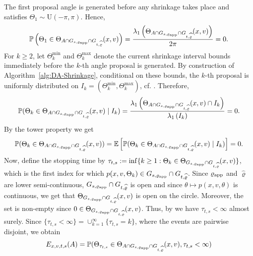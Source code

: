 \documentclass[sn-mathphys-num]{sn-jnl}%
\theoremstyle{thmstyleone}%
\theoremstyle{thmstyletwo}%
\theoremstyle{thmstylethree}%
\newcommand{\rhoapp}{\varrho_{{\rm app}}}
\begin{document}
\begin{appendices}
\begin{enumerate}
{    The first proposal angle is generated before any shrinkage takes place and satisfies $\Theta_1\sim \mathrm{U}(-\pi,\pi)$. Hence,
    \begin{align*}
        \mathbb P\left(\Theta_1\in \Theta_{A\cap G_{s,\varrho_{\textmd{app}}}\cap G_{t,\widehat{\varrho}}}(x,v)\right)= \frac{\lambda_1\left(\Theta_{A\cap G_{s,\varrho_{\textmd{app}}}\cap G_{t,\widehat{\varrho}}}(x,v)\right)}{2\pi}=0.
    \end{align*}
    For $k\geq 2$, let $\Theta^{\min}_k$ and $\Theta^{\max}_k$ denote the current shrinkage interval bounds immediately before the $k$-th angle proposal is generated. By construction of Algorithm~\ref{alg:DA-Shrinkage}, conditional on these bounds, the $k$-th proposal is uniformly distributed on $I_k=(\Theta^{\min}_k, \Theta^{\max}_k)$, cf. \citet[Equation~(4)]{HasenpflugEtAl2023}. Therefore, 
    \begin{align*}
        \mathbb{P}(\Theta_k\in \Theta_{A\cap G_{s,\varrho_{\textmd{app}}}\cap G_{t,\widehat{\varrho}}}(x,v)\mid I_k)= \frac{\lambda_1\left(\Theta_{A\cap G_{s,\varrho_{\textmd{app}}}\cap G_{t,\widehat{\varrho}}}(x,v)\cap I_k \right)}{\lambda_1\left(I_k\right)}=0.
    \end{align*}
    By the tower property we get  
    \begin{align*}
       \mathbb P(\Theta_k\in \Theta_{A\cap G_{s,\varrho_{\textmd{app}}}\cap G_{t,\widehat{\varrho}}}(x,v))=\mathbb E\left[\mathbb{P}(\Theta_k\in \Theta_{A\cap G_{s,\varrho_{\textmd{app}}}\cap G_{t,\widehat{\varrho}}}(x,v)\mid I_k)\right]=0.   
    \end{align*}
    Now, define the stopping time by $\tau_{t,s}:=\inf\{k\geq 1: \Theta_k \in \Theta_{G_{s,\varrho_{\textmd{app}}}\cap G_{t,\widehat{\varrho}}}(x,v)\}$, which is the first index for which $p(x,v, \Theta_k)\in G_{s,\varrho_{\textmd{app}}}\cap G_{t,\widehat{\varrho}}$. Since $\rhoapp$ and $\widehat{\varrho}$ are lower semi-continuous, $G_{s,\varrho_{\textmd{app}}}\cap G_{t,\widehat{\varrho}}$ is open and since $\theta\mapsto p(x,v,\theta)$ is continuous, we get that $\Theta_{G_{s,\varrho_{\textmd{app}}}\cap G_{t,\widehat{\varrho}}}(x,v)$ is open on the circle.
    Moreover, the set is non-empty since $0\in\Theta_{G_{s,\rhoapp}\cap G_{t,\widehat{\varrho}}}(x,v)$.
    Thus, by \citet[Lemma~2.7]{HasenpflugEtAl2023} we have $\tau_{t,s}<\infty$ almost surely. Since $\{\tau_{t,s}<\infty\}=\cup^\infty_{k=1}\{\tau_{t,s}=k\}$, where the events are pairwise disjoint, we obtain 
    \begin{align*}
        E_{x,v,t,s}(A)&=\mathbb{P}(\Theta_{\tau_{t,s}}\in \Theta_{A\cap G_{s,\varrho_{\textmd{app}}}\cap G_{t,\widehat{\varrho}}}(x,v), \tau_{t,s}<\infty) \\

\end{align*}}
\end{enumerate}
\end{appendices}
\end{document}
